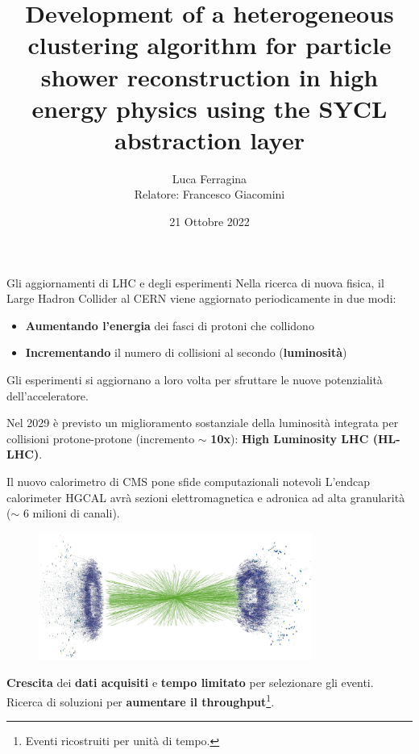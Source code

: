 \documentclass{beamer}
\title{Development of a heterogeneous clustering algorithm for particle shower reconstruction in high energy physics using the SYCL abstraction layer}
\author{Luca Ferragina \\ \vspace{15mm} {\small Relatore: Francesco Giacomini \\ \hspace{-5mm} \vspace{2mm}{\small Correlatore: Felice Pantaleo}}}
\date{21 Ottobre 2022}
\begin{document}
{ 
\begin{frame}[noframenumbering]
\maketitle
\end{frame}
}

\begin{frame}{Gli aggiornamenti di LHC e degli esperimenti}
Nella ricerca di nuova fisica, il Large Hadron Collider al CERN viene aggiornato periodicamente in due modi:
\begin{itemize}
    \item \textbf{Aumentando l'energia} dei fasci di protoni che collidono
    \item \textbf{Incrementando} il numero di collisioni al secondo (\textbf{luminosità})
\end{itemize}

Gli esperimenti si aggiornano a loro volta per sfruttare le nuove potenzialità dell'acceleratore.

\hspace{10mm}

Nel 2029 è previsto un miglioramento sostanziale della luminosità integrata per collisioni protone-protone (incremento $\sim$ \textbf{10x}): \textbf{High Luminosity LHC (HL-LHC)}.

\end{frame}

\begin{frame}{Il nuovo calorimetro di CMS pone sfide computazionali notevoli}
L'endcap calorimeter HGCAL avrà sezioni elettromagnetica e adronica ad alta granularità ($\sim$ 6 milioni di canali).

\begin{figure}
    \centering
    \includegraphics[width=0.8\textwidth]{media/presentazione/particle_shower.png}
\end{figure}

\textbf{Crescita} dei \textbf{dati acquisiti} e \textbf{tempo limitato} per selezionare gli eventi. Ricerca di soluzioni per \textbf{aumentare il throughput}\footnote{Eventi ricostruiti per unità di tempo.}.

\end{frame}
\end{document}
